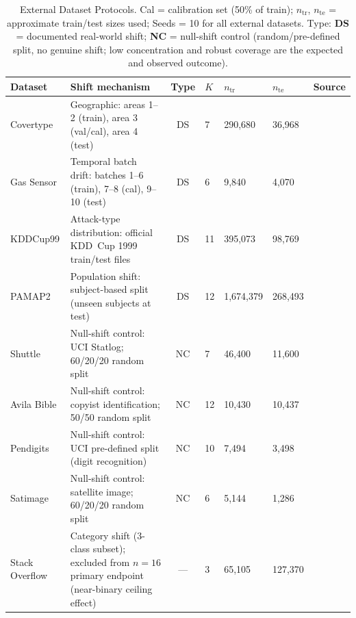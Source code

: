 \documentclass{uai2026} %
\begin{document}
\begin{table}[htbp]
\centering
\caption{External Dataset Protocols. Cal = calibration set (50\% of train); $n_\text{tr}$, $n_\text{te}$ = approximate train/test sizes used; Seeds = 10 for all external datasets. Type: \textbf{DS} = documented real-world shift; \textbf{NC} = null-shift control (random/pre-defined split, no genuine shift; low concentration and robust coverage are the expected and observed outcome).}\label{tab:external_datasets}
\small
\begin{tabular}{@{}lp{4.8cm}clllc@{}}
\toprule
Dataset & Shift mechanism & Type & $K$ & $n_\text{tr}$ & $n_\text{te}$ & Source \\
\midrule
Covertype       & Geographic: areas 1--2 (train), area 3 (val/cal), area 4 (test) & DS & 7 & 290,680 & 36,968 & \citep{dua2017uci} \\
Gas Sensor      & Temporal batch drift: batches 1--6 (train), 7--8 (cal), 9--10 (test) & DS & 6 & 9,840 & 4,070 & \citep{dua2017uci} \\
KDDCup99        & Attack-type distribution: official KDD~Cup 1999 train/test files & DS & 11 & 395,073 & 98,769 & \citep{dua2017uci} \\
PAMAP2          & Population shift: subject-based split (unseen subjects at test) & DS & 12 & 1,674,379 & 268,493 & \citep{dua2017uci} \\
Shuttle         & Null-shift control: UCI Statlog; 60/20/20 random split & NC & 7 & 46,400 & 11,600 & \citep{dua2017uci} \\
Avila Bible     & Null-shift control: copyist identification; 50/50 random split & NC & 12 & 10,430 & 10,437 & \citep{dua2017uci} \\
Pendigits       & Null-shift control: UCI pre-defined split (digit recognition) & NC & 10 & 7,494 & 3,498 & \citep{dua2017uci} \\
Satimage        & Null-shift control: satellite image; 60/20/20 random split & NC & 6 & 5,144 & 1,286 & \citep{dua2017uci} \\
Stack Overflow  & Category shift (3-class subset); excluded from $n=16$ primary endpoint (near-binary ceiling effect) & --- & 3 & 65,105 & 127,370 & \citep{dua2017uci} \\
\bottomrule
\end{tabular}



\end{table}
\end{document}
